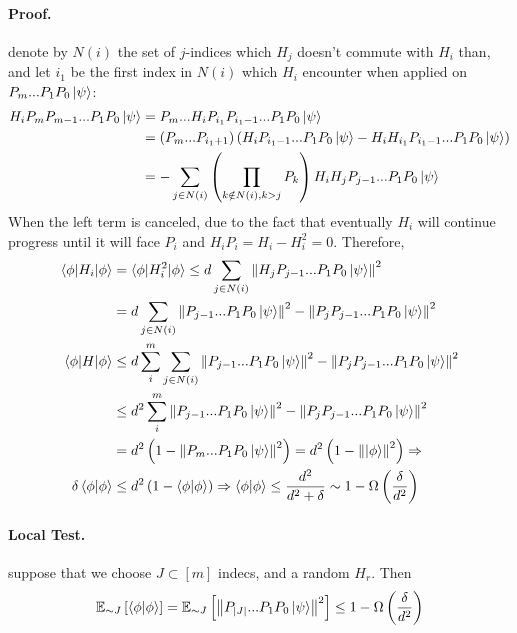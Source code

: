 \paragraph{Proof.} denote by \(N(i)\) the set of \(j\)-indices which \(H_j\) doesn't commute with \(H_i\) than, and let \(i_1\) be the first index in \( N(i) \) which \( H_i \) encounter when applied on \( \PPj{P_m} \): 
\[ \begin{split}
    \PPj{H_{i}P_{m}P_{m-1}} & = P_{m}...\PPj{H_{i}P_{i_1}P_{i_1-1}}  \\ 
    &= \left( P_{m}...P_{i_1+1} \right)\left( \PPj{H_{i}P_{i_1-1}} - \PPj{H_{i}H_{i_1}P_{i_1-1}}   \right)  \\ 
    & = - \sum_{j\in N(i) } \left( \prod_{k\notin N(i), k > j}{P_k} \right) \PPj{H_{i}H_{j}P_{j-1}}
\end{split}
\]
When the left term is canceled, due to the fact that eventually \(H_i\) will continue progress until it will face \( P_i \) and \( H_i P_i = H_i - H_{i}^2 = 0. \) Therefore, \[ \begin{split}
    \Obs{\phi}{H_i} & = \Obs{\phi}{H_{i}^2} \le d \sum_{j\in N(i)} {\norm{ \PPj{H_j P_{j-1}}}^2 } \\ 
    &= d \sum_{j\in N(i)} { \norm{ \PPj{P_{j-1}}}^2 - \norm{ \PPj{P_{j} P_{j-1}}}^2 } \\ 
    \Obs{\phi}{H} & \le d \sum_{i}^{m}{\sum_{j\in N(i)} { \norm{ \PPj{P_{j-1}}}^2 - \norm{ \PPj{P_{j} P_{j-1}}}^2 }} \\
    &\le d^2 \sum_{i}^{m}{ \norm{ \PPj{P_{j-1}}}^2 - \norm{ \PPj{P_{j} P_{j-1}}}^2 } \\
    &= d^2\left(1 - \norm{\PPj{P_m}}^2\right)=d^2\left(1 - \norm{\ket{\phi}} ^2\right) \Rightarrow \\ 
    \delta \braket{\phi|\phi} & \le d^2 \left(1 - \braket{\phi|\phi}\right) \Rightarrow \braket{\phi|\phi} \le \frac{d^2}{d^2 + \delta} \sim 1 - \Omega\left( \frac{\delta}{d^2} \right)
\end{split}   \] 

\paragraph{Local Test.} suppose that we choose \(J \subset [m] \) indecs, and a random \ham \( H_r\).  Then \begin{equation}
    \Exp{\braket{\phi|\phi}}{\sim J} = \Exp{\norm{ \PPj{P_{|J|}} }^2}{\sim J} \le 1 - \Omega\left( \frac{\delta}{d^2} \right)  
\end{equation}
